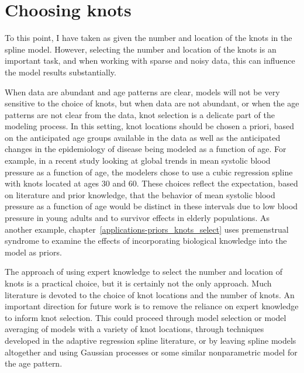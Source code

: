 \section{Choosing knots}

To this point, I have taken as given the number and location of the
knots in the spline model. However, selecting the number and location
of the knots is an important task, and when working with sparse and
noisy data, this can influence the model results
substantially.

When data are abundant and age patterns are clear, models will not be
very sensitive to the choice of knots, but when data are not abundant, or
when the age patterns are not clear from the data, knot
selection is a delicate part of the modeling process.  In this
setting, knot locations should be chosen a priori, based on the
anticipated age groups available in the data as well as the anticipated changes in
the epidemiology of disease being modeled as a function of age. For example, in a recent
study looking at global trends in mean systolic blood pressure as a
function of age, the modelers chose to use a cubic regression spline
with knots located at ages $30$ and $60$.\cite{danaei_national_2011} These
choices reflect the expectation, based on literature and prior
knowledge, that the behavior of mean systolic blood pressure as a
function of age would be distinct in these intervals due to low blood
pressure in young adults and to survivor effects in elderly populations.
As another example, chapter~\ref{applications-priors_knots_select} uses
premenstrual syndrome to examine the effects of incorporating biological
knowledge into the model as priors.

The approach of using expert knowledge to select the number
and location of knots is a practical choice,
but it is certainly not the only
approach. Much literature is devoted to the choice of knot locations
and the number of knots.
An important direction for future work is to remove the reliance on
expert knowledge to inform knot selection.  This could proceed
through model selection or model averaging of models with a variety of
knot locations, \cite{raftery_bayesian_1997} through
techniques developed in the adaptive regression spline literature,
\cite{friedman_multivariate_1991} or by leaving spline models altogether and using Gaussian
processes or some similar nonparametric model for the age pattern.
\cite{rasmussen_gaussian_2006,diggle_model-based_2010}

